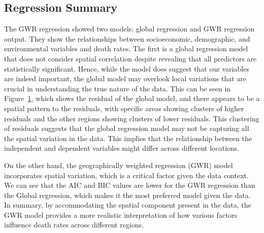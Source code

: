 \documentclass[
]{article}
\begin{document}
\subsection{Regression Summary}\label{regression-summary}

The GWR regression showed two models: global regression and GWR
regression output. They show the relationships between socioeconomic,
demographic, and environmental variables and death rates. The first is a
global regression model that does not consider spatial correlation
despite revealing that all predictors are statistically significant.
Hence, while the model does suggest that our variables are indeed
important, the global model may overlook local variations that are
crucial in understanding the true nature of the data. This can be seen
in Figure~\ref{fig-2}, which shows the residual of the global model, and
there appears to be a spatial pattern to the residuals, with specific
areas showing clusters of higher residuals and the other regions showing
clusters of lower residuals. This clustering of residuals suggests that
the global regression model may not be capturing all the spatial
variation in the data. This implies that the relationship between the
independent and dependent variables might differ across different
locations.

On the other hand, the geographically weighted regression (GWR) model
incorporates spatial variation, which is a critical factor given the
data context. We can see that the AIC and BIC values are lower for the
GWR regression than the Global regression, which makes it the most
preferred model given the data.~ In summary, by accommodating the
spatial component present in the data, the GWR model provides a more
realistic interpretation of how various factors influence death rates
across different regions.

\begin{figure}


\caption{\label{fig-2}}

\end{figure}%
\end{document}
